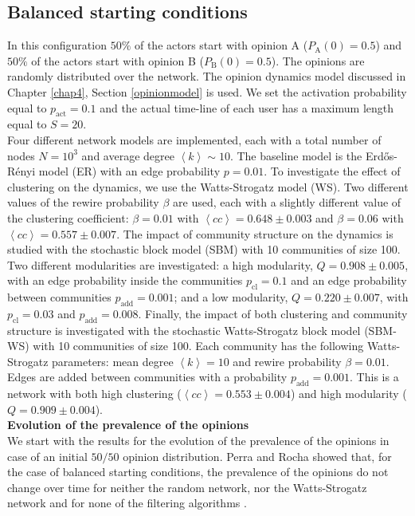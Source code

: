\documentclass[11 pt , letterpaper , twoside , openright]{book}
\begin{document}
\subsection{Balanced starting conditions}
\label{50-50}
In this configuration $50 \%$ of the actors start with opinion A ($P_{\text{A}}(0) = 0.5$) and $50 \%$ of the actors start with opinion B ($P_{\text{B}}(0) = 0.5$). The opinions are randomly distributed over the network. The opinion dynamics model discussed in Chapter \ref{chap4}, Section \ref{opinionmodel} is used. We set the activation probability equal to $p_{\text{act}} = 0.1$ and the actual time-line of each user has a maximum length equal to $S=20$.\\
\newline
Four different network models are implemented, each with a total number of nodes $N = 10^3$ and average degree $\left<k\right> \sim 10$. The baseline model is the Erd\H{o}s-R\'{e}nyi model (ER) with an edge probability $p = 0.01$. To investigate the effect of clustering on the dynamics, we use the Watts-Strogatz model (WS). Two different values of the rewire probability $\beta$ are used, each with a slightly different value of the clustering coefficient: $\beta = 0.01$ with $\left<cc\right> = 0.648 \pm 0.003$ and $\beta = 0.06$ with $\left<cc\right> = 0.557 \pm 0.007$. The impact of community structure on the dynamics is studied with the stochastic block model (SBM) with 10 communities of size 100. Two different modularities are investigated: a high modularity, $Q = 0.908 \pm 0.005$, with an edge probability inside the communities $p_{\text{cl}} = 0.1$ and an edge probability between communities $p_{\text{add}} = 0.001$; and a low modularity, $Q = 0.220 \pm 0.007$, with $p_{\text{cl}} = 0.03$ and $p_{\text{add}} = 0.008$. Finally, the impact of both clustering and community structure is investigated with the stochastic Watts-Strogatz block model (SBM-WS) with 10 communities of size 100. Each community has the following Watts-Strogatz parameters: mean degree $\left<k\right> =10$ and rewire probability $\beta = 0.01$. Edges are added between communities with a probability $p_{\text{add}} = 0.001$. This is a network with both high clustering ($\left<cc\right> = 0.553 \pm 0.004$) and high modularity ($Q = 0.909 \pm 0.004$).  \\
\newline
\textbf{Evolution of the prevalence of the opinions}\\
\newline
We start with the results for the evolution of the prevalence of the opinions in case of an initial $50/50$ opinion distribution. Perra and Rocha showed that, for the case of balanced starting conditions, the prevalence of the opinions do not change over time for neither the random network, nor the Watts-Strogatz network and for none of the filtering algorithms \cite{Perra2019}. 
\end{document}
